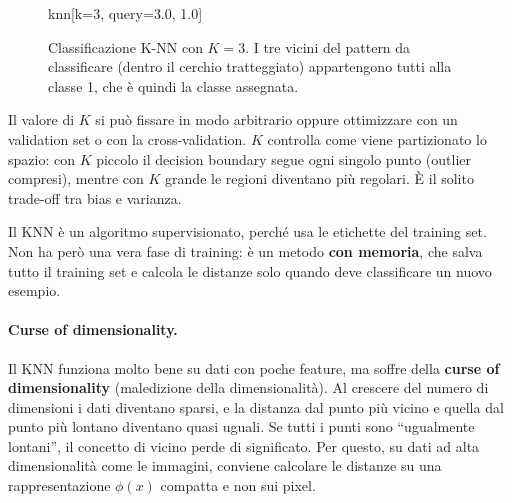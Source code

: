 \begin{figure}[htbp]
\centering
\begin{widget}{knn}[k=3, query={3.0, 1.0}]
\end{widget}
\caption{Classificazione K-NN con $K = 3$. I tre vicini del pattern da classificare (dentro il cerchio tratteggiato) appartengono tutti alla classe 1, che è quindi la classe assegnata.}
\label{fig:knn}
\end{figure}

Il valore di $K$ si può fissare in modo arbitrario oppure ottimizzare con un validation set o con la cross-validation. $K$ controlla come viene partizionato lo spazio: con $K$ piccolo il decision boundary segue ogni singolo punto (outlier compresi), mentre con $K$ grande le regioni diventano più regolari. È il solito trade-off tra bias e varianza.

Il KNN è un algoritmo supervisionato, perché usa le etichette del training set. Non ha però una vera fase di training: è un metodo \textbf{con memoria}, che salva tutto il training set e calcola le distanze solo quando deve classificare un nuovo esempio.

\paragraph{Curse of dimensionality.}
Il KNN funziona molto bene su dati con poche feature, ma soffre della \textbf{curse of dimensionality} (maledizione della dimensionalità). Al crescere del numero di dimensioni i dati diventano sparsi, e la distanza dal punto più vicino e quella dal punto più lontano diventano quasi uguali. Se tutti i punti sono ``ugualmente lontani'', il concetto di vicino perde di significato. Per questo, su dati ad alta dimensionalità come le immagini, conviene calcolare le distanze su una rappresentazione $\phi(x)$ compatta e non sui pixel.

